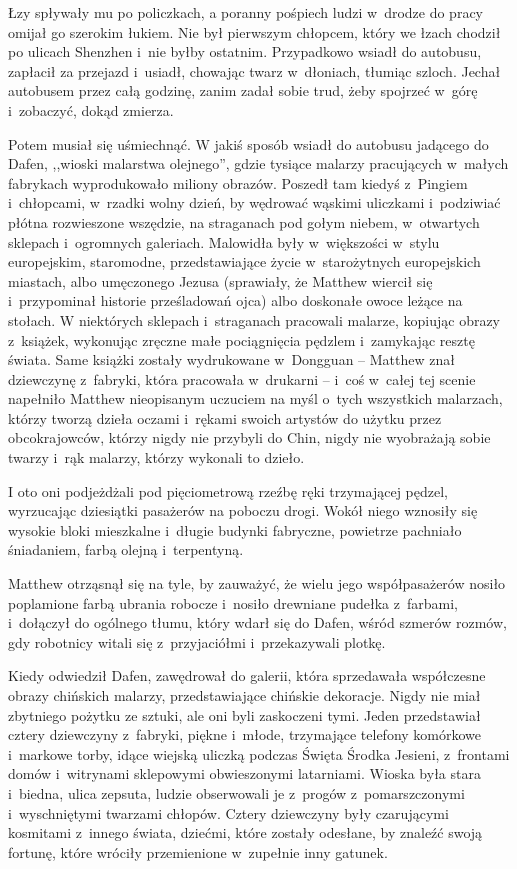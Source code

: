 \documentclass[oneside,polish,11pt,rmheadings]{mwbk}
\begin{document}
Łzy spływały mu po policzkach, a poranny pośpiech ludzi w~drodze do pracy omijał go szerokim łukiem. Nie był pierwszym chłopcem, który we łzach chodził po ulicach Shenzhen i~nie byłby ostatnim. Przypadkowo wsiadł do autobusu, zapłacił za przejazd i~usiadł, chowając twarz w~dłoniach, tłumiąc szloch. Jechał autobusem przez całą godzinę, zanim zadał sobie trud, żeby spojrzeć w~górę i~zobaczyć, dokąd zmierza.

Potem musiał się uśmiechnąć. W jakiś sposób wsiadł do autobusu jadącego do Dafen, ,,wioski malarstwa olejnego'', gdzie tysiące malarzy pracujących w~małych fabrykach wyprodukowało miliony obrazów. Poszedł tam kiedyś z~Pingiem i~chłopcami, w~rzadki wolny dzień, by wędrować wąskimi uliczkami i~podziwiać płótna rozwieszone wszędzie, na straganach pod gołym niebem, w~otwartych sklepach i~ogromnych galeriach. Malowidła były w~większości w~stylu europejskim, staromodne, przedstawiające życie w~starożytnych europejskich miastach, albo umęczonego Jezusa (sprawiały, że Matthew wiercił się i~przypominał historie prześladowań ojca) albo doskonałe owoce leżące na stołach. W niektórych sklepach i~straganach pracowali malarze, kopiując obrazy z~książek, wykonując zręczne małe pociągnięcia pędzlem i~zamykając resztę świata. Same książki zostały wydrukowane w~Dongguan -- Matthew znał dziewczynę z~fabryki, która pracowała w~drukarni – i~coś w~całej tej scenie napełniło Matthew nieopisanym uczuciem na myśl o~tych wszystkich malarzach, którzy tworzą dzieła oczami i~rękami swoich artystów do użytku przez obcokrajowców, którzy nigdy nie przybyli do Chin, nigdy nie wyobrażają sobie twarzy i~rąk malarzy, którzy wykonali to dzieło.

I oto oni podjeżdżali pod pięciometrową rzeźbę ręki trzymającej pędzel, wyrzucając dziesiątki pasażerów na poboczu drogi. Wokół niego wznosiły się wysokie bloki mieszkalne i~długie budynki fabryczne, powietrze pachniało śniadaniem, farbą olejną i~terpentyną.

Matthew otrząsnął się na tyle, by zauważyć, że wielu jego współpasażerów nosiło poplamione farbą ubrania robocze i~nosiło drewniane pudełka z~farbami, i~dołączył do ogólnego tłumu, który wdarł się do Dafen, wśród szmerów rozmów, gdy robotnicy witali się z~przyjaciółmi i~przekazywali plotkę.

Kiedy odwiedził Dafen, zawędrował do galerii, która sprzedawała współczesne obrazy chińskich malarzy, przedstawiające chińskie dekoracje. Nigdy nie miał zbytniego pożytku ze sztuki, ale oni byli zaskoczeni tymi. Jeden przedstawiał cztery dziewczyny z~fabryki, piękne i~młode, trzymające telefony komórkowe i~markowe torby, idące wiejską uliczką podczas Święta Środka Jesieni, z~frontami domów i~witrynami sklepowymi obwieszonymi latarniami. Wioska była stara i~biedna, ulica zepsuta, ludzie obserwowali je z~progów z~pomarszczonymi i~wyschniętymi twarzami chłopów. Cztery dziewczyny były czarującymi kosmitami z~innego świata, dziećmi, które zostały odesłane, by znaleźć swoją fortunę, które wróciły przemienione w~zupełnie inny gatunek.
\end{document}

